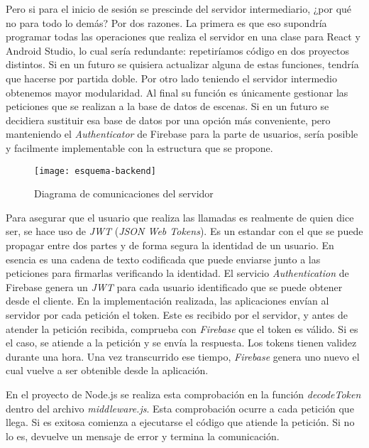 Pero si para el inicio de sesión se prescinde del servidor intermediario, ¿por qué no para todo lo demás? Por dos razones. La primera es que eso supondría programar todas las operaciones que realiza el servidor en una clase para React y Android Studio, lo cual sería redundante: repetiríamos código en dos proyectos distintos. Si en un futuro se quisiera actualizar alguna de estas funciones, tendría que hacerse por partida doble. Por otro lado teniendo el servidor intermedio obtenemos mayor modularidad. Al final su función es únicamente gestionar las peticiones que se realizan a la base de datos de escenas. Si en un futuro se decidiera sustituir esa base de datos por una opción más conveniente, pero manteniendo el \textit{Authenticator} de Firebase para la parte de usuarios, sería posible y facilmente implementable con la estructura que se propone.

\begin{figure}[h]
    \centering
    \texttt{[image: esquema-backend]}
    \caption[Diagrama de comunicaciones del servidor]{Diagrama de comunicaciones del servidor}
\end{figure}

Para asegurar que el usuario que realiza las llamadas es realmente de quien dice ser, se hace uso de \textit{JWT} (\textit{JSON Web Tokens}). Es un estandar con el que se puede propagar entre dos partes y de forma segura la identidad de un usuario. En esencia es una cadena de texto codificada que puede enviarse junto a las peticiones para firmarlas verificando la identidad. El servicio \textit{Authentication} de Firebase genera un \textit{JWT} para cada usuario identificado que se puede obtener desde el cliente. En la implementación realizada, las aplicaciones envían al servidor por cada petición el token. Este es recibido por el servidor, y antes de atender la petición recibida, comprueba con \textit{Firebase} que el token es válido. Si es el caso, se atiende a la petición y se envía la respuesta. Los tokens tienen validez durante una hora. Una vez transcurrido ese tiempo, \textit{Firebase} genera uno nuevo el cual vuelve a ser obtenible desde la aplicación.

En el proyecto de Node.js se realiza esta comprobación en la función \textit{decodeToken} dentro del archivo \textit{middleware.js}. Esta comprobación ocurre a cada petición que llega. Si es exitosa comienza a ejecutarse el código que atiende la petición. Si no lo es, devuelve un mensaje de error y termina la comunicación.